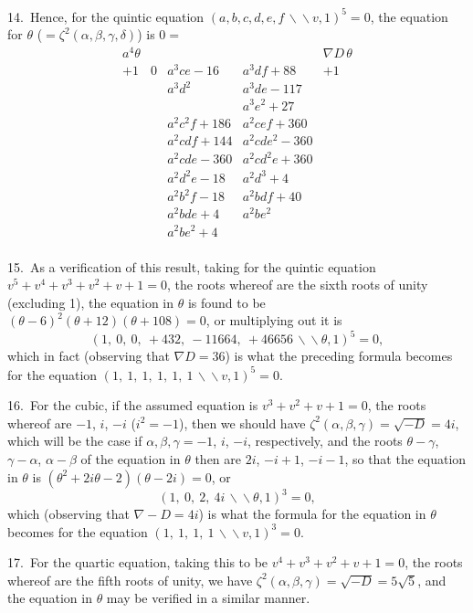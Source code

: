 \documentclass[11pt,a4paper]{book}
\begin{document}
14.\ Hence, for the quintic equation $(a,b,c,d,e,f\,\backslash\!\!\backslash v,1)^5=0$, the equation for $\theta$ ($=\zeta^2(\alpha,\beta,\gamma,\delta)$) is $0=$
\[
\begin{array}{ccccc}
a^4\theta & & & & \nabla D\,\theta\\
+1 & 0 & a^3ce-16 & a^3df+88 & +1\\
& & a^3d^2 & a^3de-117 & \\
& & & a^3e^2+27 & \\
& & a^2c^2f+186 & a^2cef+360 & \\
& & a^2cdf+144 & a^2cde^2-360 & \\
& & a^2cde-360 & a^2cd^2e+360 & \\
& & a^2d^2e-18 & a^2d^3+4 & \\
& & a^2b^2f-18 & a^2bdf+40 & \\
& & a^2bde+4 & a^2be^2 & \\
& & a^2be^2+4 & & \\
\end{array}
\]

\newpage
\setcounter{page}{305}

15.\ As a verification of this result, taking for the quintic equation $v^5+v^4+v^3+v^2+v+1=0$, the roots whereof are the sixth roots of unity (excluding 1), the equation in $\theta$ is found to be $(\theta-6)^2(\theta+12)(\theta+108)=0$, or multiplying out it is
\[
(1,\ 0,\ 0,\ +432,\ -11664,\ +46656\,\backslash\!\!\backslash\theta, 1)^5 = 0,
\]
which in fact (observing that $\nabla D=36$) is what the preceding formula becomes for the equation $(1,\ 1,\ 1,\ 1,\ 1,\ 1\,\backslash\!\!\backslash v, 1)^5=0$.

16.\ For the cubic, if the assumed equation is $v^3+v^2+v+1=0$, the roots whereof are $-1$, $i$, $-i$ ($i^2=-1$), then we should have $\zeta^2(\alpha,\beta,\gamma)=\sqrt{-D}=4i$, which will be the case if $\alpha,\beta,\gamma=-1$, $i$, $-i$, respectively, and the roots $\theta-\gamma$, $\gamma-\alpha$, $\alpha-\beta$ of the equation in $\theta$ then are $2i$, $-i+1$, $-i-1$, so that the equation in $\theta$ is $(\theta^2+2i\theta-2)(\theta-2i)=0$, or
\[
(1,\ 0,\ 2,\ 4i\,\backslash\!\!\backslash\theta,1)^3=0,
\]
which (observing that $\nabla-D=4i$) is what the formula for the equation in $\theta$ becomes for the equation $(1,\ 1,\ 1,\ 1\,\backslash\!\!\backslash v, 1)^3=0$.

17.\ For the quartic equation, taking this to be $v^4+v^3+v^2+v+1=0$, the roots whereof are the fifth roots of unity, we have $\zeta^2(\alpha,\beta,\gamma)=\sqrt{-D}=5\sqrt{5}$, and the equation in $\theta$ may be verified in a similar manner.
\end{document}
